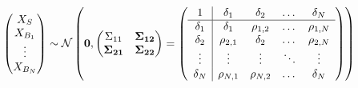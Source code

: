 \documentclass[12pt]{article}
\renewcommand{\P}{\mathbb{P}}
\theoremstyle{definition}
\theoremstyle{definition}
\def\P{{\mathbb P}}
\begin{document}
\begin{align}
\left(\begin{matrix} X_S \\ X_{B_1}\\ \vdots \\ X_{B_N} \end{matrix}\right) &\sim \mathcal{N}\left( 
 \boldsymbol{0}, \left(\begin{matrix} 
\Sigma_{11} & {\bf \Sigma_{12}}\\
{\bf\Sigma_{21}} & {\bf \Sigma_{22}}\\
 \end{matrix}\right) 
 =
 \left(\begin{array}{c | c c cc }
1 & \delta_1 & \delta_2 & \dots & \delta_N  \\ \hline
\delta_1 & \delta_1 &\rho_{1,2} & \dots & \rho_{1,N}   \\ 
\delta_2 & \rho_{2,1} & \delta_2 & \dots & \rho_{2,N}  \\ 
\vdots & \vdots & \vdots & \ddots & \vdots  \\ 
\delta_N & \rho_{N,1} & \rho_{N,2} & \dots & \delta_N\\ 
 \end{array}\right)\right)  \label{Nforecasters}
\end{align}
\end{document}
